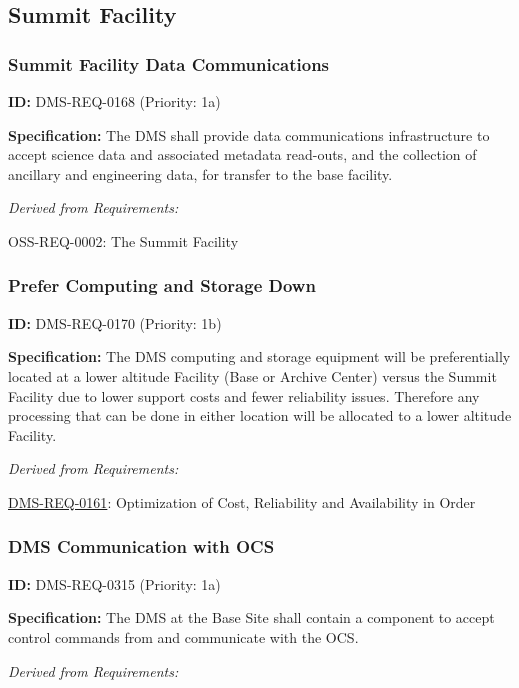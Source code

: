 \documentclass[SE,toc,lsstdraft]{lsstdoc}
\begin{document}
\subsection{Summit Facility}

\subsubsection{Summit Facility Data Communications}

\label{DMS-REQ-0168}
\textbf{ID:} DMS-REQ-0168 (Priority: 1a)

\textbf{Specification:} The DMS shall provide data communications infrastructure to accept science data and associated metadata read-outs, and the collection of ancillary and engineering data, for transfer to the base facility.

\emph{Derived from Requirements:}

OSS-REQ-0002:
The Summit Facility \newline

\subsubsection{Prefer Computing and Storage Down}

\label{DMS-REQ-0170}
\textbf{ID:} DMS-REQ-0170 (Priority: 1b)

\textbf{Specification: }The DMS computing and storage equipment will be preferentially located at a lower altitude Facility (Base or Archive Center) versus the Summit Facility due to lower support costs and fewer reliability issues. Therefore any processing that can be done in either location will be allocated to a lower altitude Facility.

\emph{Derived from Requirements:}

\hyperref[DMS-REQ-0161]{DMS-REQ-0161}:
Optimization of Cost, Reliability and Availability in Order \newline

\subsubsection{DMS Communication with OCS}

\label{DMS-REQ-0315}
\textbf{ID:} DMS-REQ-0315 (Priority: 1a)

\textbf{Specification:} The DMS at the Base Site shall contain a component to accept control commands from and communicate with the OCS.

\emph{Derived from Requirements:}
\end{document}
